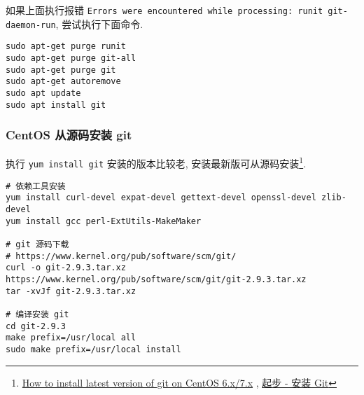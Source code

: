 如果上面执行报错
\lstinline!Errors were encountered while processing: runit git-daemon-run!,
尝试执行下面命令.

\begin{lstlisting}
sudo apt-get purge runit
sudo apt-get purge git-all
sudo apt-get purge git
sudo apt-get autoremove
sudo apt update
sudo apt install git
\end{lstlisting}

\subsubsection{CentOS 从源码安装
git}\label{centos-ux4eceux6e90ux7801ux5b89ux88c5-git}

执行 \lstinline!yum install git! 安装的版本比较老,
安装最新版可从源码安装\footnote{\href{http://stackoverflow.com/questions/21820715/how-to-install-latest-version-of-git-on-centos-6-x-7-x}{How
  to install latest version of git on CentOS 6.x/7.x} ,
  \href{https://git-scm.com/book/zh/v1/\%E8\%B5\%B7\%E6\%AD\%A5-\%E5\%AE\%89\%E8\%A3\%85-Git}{起步
  - 安装 Git}}.

\begin{lstlisting}
# 依赖工具安装
yum install curl-devel expat-devel gettext-devel openssl-devel zlib-devel
yum install gcc perl-ExtUtils-MakeMaker

# git 源码下载
# https://www.kernel.org/pub/software/scm/git/
curl -o git-2.9.3.tar.xz https://www.kernel.org/pub/software/scm/git/git-2.9.3.tar.xz
tar -xvJf git-2.9.3.tar.xz

# 编译安装 git
cd git-2.9.3
make prefix=/usr/local all
sudo make prefix=/usr/local install
\end{lstlisting}

